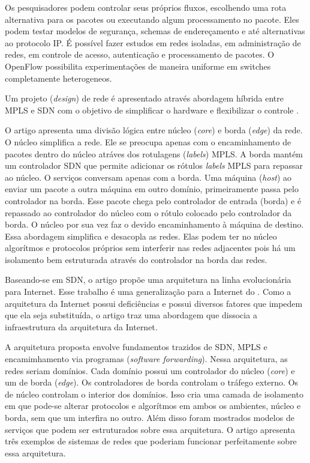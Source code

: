 Os pesquisadores podem controlar seus próprios fluxos, escolhendo uma rota
alternativa para os pacotes ou executando algum processamento no pacote. 
Eles podem testar modelos de segurança, schemas de endereçamento e até 
alternativas ao protocolo IP. 
É possível fazer estudos em redes isoladas, em administração de redes, 
em controle de acesso, autenticação e processamento de pacotes.
O OpenFlow possibilita experimentações de maneira uniforme em switches 
completamente heterogeneos. 

Um projeto (\emph{design}) de rede é apresentado através abordagem híbrida 
entre MPLS e SDN com o objetivo de simplificar o hardware e flexibilizar 
o controle \citep{fabric2012martin}. 

O artigo apresenta uma divisão lógica entre núcleo (\emph{core}) e 
borda (\emph{edge}) da rede.
O núcleo simplifica a rede.
Ele se preocupa apenas com o encaminhamento de pacotes dentro do núcleo 
atráves dos rotulagens (\emph{labels}) MPLS. 
A borda mantém um controlador SDN que permite adicionar os rótulos 
\emph{labels} MPLS para repassar ao núcleo. 
O serviços conversam apenas com a borda. 
Uma máquina (\emph{host}) ao enviar um pacote a outra máquina em outro domínio, 
primeiramente passa pelo controlador na borda. 
Esse pacote chega pelo controlador de entrada (borda) e é repassado ao 
controlador do núcleo com o rótulo colocado pelo controlador da borda.
O núcleo por sua vez faz o devido encaminhamento à máquina de destino. 
Essa abordagem simplifica e desacopla as redes. 
Elas podem ter no núcleo algorítmos e protocolos próprios sem interferir nas 
redes adjacentes pois há um isolamento bem estruturada através do controlador 
na borda das redes.

Baseando-se em SDN, o artigo \citep{barath2012software} propõe uma arquitetura 
na linha evolucionária para Internet.
Esse trabalho é uma generalização para a Internet do \citep{fabric2012martin}.
Como a arquitetura da Internet possui deficiências e possui diversos fatores
que impedem que ela seja substituída, o artigo traz uma abordagem que dissocia 
a infraestrutura da arquitetura da Internet. 

A arquitetura proposta envolve fundamentos trazidos de SDN, MPLS e 
encamimhamento via programas (\emph{software forwarding}). 
Nessa arquitetura, as redes seriam domínios. 
Cada domínio possui um controlador do núcleo (\emph{core}) e um 
de borda (\emph{edge}). 
Os controladores de borda controlam o tráfego externo. 
Os de núcleo controlam o interior dos domínios. 
Isso cria uma camada de isolamento em que pode-se alterar protocolos e 
algorítmos em ambos os ambientes, núcleo e borda, sem que um interfira 
no outro.
Além disso foram mostrados modelos de serviços que podem ser estruturados 
sobre essa arquitetura. 
O artigo apresenta três exemplos de sistemas de redes que poderiam funcionar 
perfeitamente sobre essa arquitetura.


